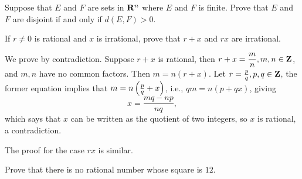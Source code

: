 \begin{exercise}
Suppose that $E$ and $F$ are sets in $\mathbf R^n$ where $E$ and $F$ is finite. Prove that $E$ and $F$ are disjoint if and only if $d(E,F)>0$.
\end{exercise}
\pagebreak

\begin{exercise}[Rudin Q1]
If $r\neq0$ is rational and $x$ is irrational, prove that $r+x$ and $rx$ are irrational.
\end{exercise}

\begin{solution}
We prove by contradiction. Suppose $r+x$ is rational, then $r+x=\dfrac{m}{n},m,n\in\mathbf Z$, and $m,n$ have no common factors. Then $m=n(r+x)$. Let $r=\frac{p}{q},p,q\in\mathbf Z$, the former equation implies that $m=n\left(\frac{p}{q}+x\right)$, i.e., $qm=n(p+qx)$, giving
\[x=\frac{mq-np}{nq},\]
which says that $x$ can be written as the quotient of two integers, so $x$ is rational, a contradiction.

The proof for the case $rx$ is similar.
\end{solution}

\begin{exercise}[Rudin Q2]
Prove that there is no rational number whose square is $12$.
\end{exercise}
